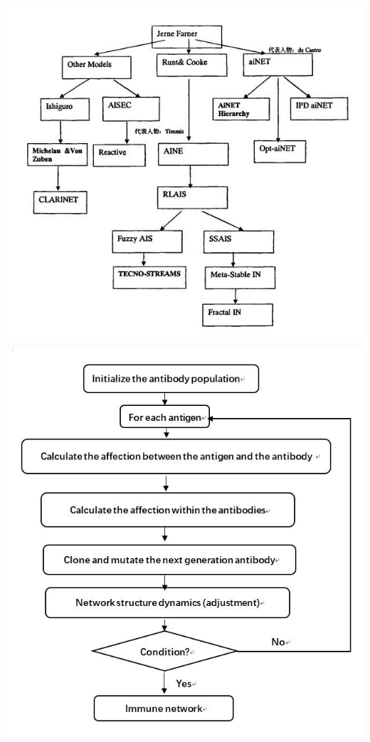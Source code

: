 \documentclass{article}
\begin{document}
\begin{center}
    \includegraphics[width=.8\textwidth]{images/Figure_3.jpg}\\
\end{center}


\begin{center}
    \includegraphics[width=.8\textwidth]{images/Figure_4.jpg}\\
\end{center}
\end{document}
